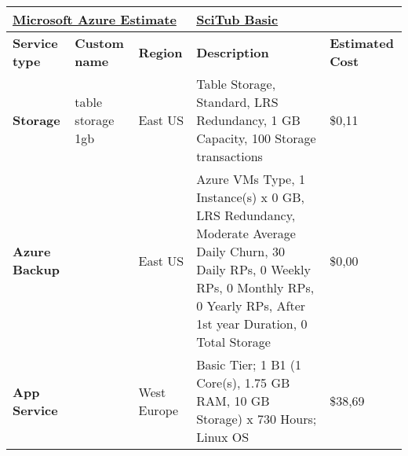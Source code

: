 %

\begin{landscape}
\begin{table}[]
\begin{tabular}{lllll}        %
\hline
\multicolumn{3}{l}{{\ul \textbf{Microsoft Azure Estimate}}}                     & {\ul \textbf{SciTub Basic}}                                                                                                                                                                                                                      & {\ul \textbf{}}                          \\ \hline
\textbf{Service type}             & \textbf{Custom name}      & \textbf{Region} & \textbf{Description}                                                                                                                                                                                                                             & \textbf{Estimated Cost}                  \\ \hline\hline
\textbf{Storage}                  & table storage 1gb         & East US         & Table Storage, Standard, LRS Redundancy, 1 GB Capacity, 100 Storage transactions                                                                                                                                                                 & \$0,11                                   \\ \hline
\textbf{Azure Backup}             &                           & East US         & Azure VMs Type, 1 Instance(s) x 0 GB, LRS Redundancy, Moderate Average Daily Churn, 30 Daily RPs, 0 Weekly RPs, 0 Monthly RPs, 0 Yearly RPs,  After 1st year Duration, 0 Total Storage                                                           & \$0,00                                   \\ \hline
\textbf{App Service}              &                           & West Europe     & Basic Tier; 1 B1 (1 Core(s), 1.75 GB RAM, 10 GB Storage) x 730 Hours; Linux OS                                                                                                                                                                   & \$38,69                                  \\ \hline

\end{tabular}
\end{table}
\end{landscape}
